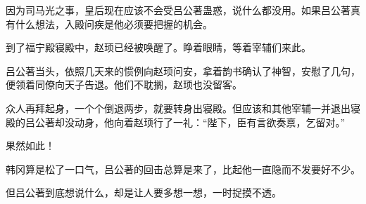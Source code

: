 因为司马光之事，皇后现在应该不会受吕公著蛊惑，说什么都没用。如果吕公著真有什么想法，入殿问疾是他必须要把握的机会。

到了福宁殿寝殿中，赵顼已经被唤醒了。睁着眼睛，等着宰辅们来此。

吕公著当头，依照几天来的惯例向赵顼问安，拿着韵书确认了神智，安慰了几句，便领着同僚向天子告退。他们不耽搁，赵顼也没留客。

众人再拜起身，一个个倒退两步，就要转身出寝殿。但应该和其他宰辅一并退出寝殿的吕公著却没动身，他向着赵顼行了一礼：“陛下，臣有言欲奏禀，乞留对。”

果然如此！

韩冈算是松了一口气，吕公著的回击总算是来了，比起他一直隐而不发要好不少。

但吕公著到底想说什么，却是让人要多想一想，一时捉摸不透。

